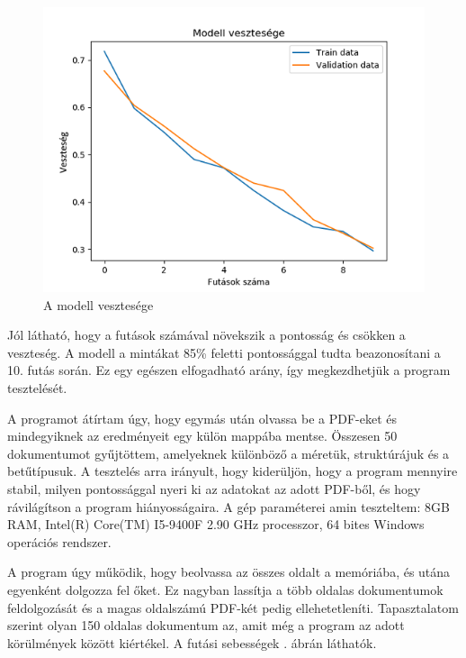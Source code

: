 \begin{figure}[h!]
\centering
\includegraphics[scale=1]{images/loss.png}
\caption{A modell vesztesége}
\label{fig:loss}
\end{figure}

Jól látható, hogy a futások számával növekszik a pontosság és csökken a veszteség. A modell a mintákat 85\% feletti pontossággal tudta beazonosítani a 10. futás során. Ez egy egészen elfogadható arány, így megkezdhetjük a program tesztelését.


A programot átírtam úgy, hogy egymás után olvassa be a PDF-eket és mindegyiknek az eredményeit egy külön mappába mentse. Összesen 50 dokumentumot gyűjtöttem, amelyeknek különböző a méretük, struktúrájuk és a betűtípusuk. A tesztelés arra irányult, hogy kiderüljön, hogy a program mennyire stabil, milyen pontossággal nyeri ki az adatokat az adott PDF-ből, és hogy rávilágítson a program hiányosságaira. A gép paraméterei amin teszteltem: 8GB RAM, Intel(R) Core(TM) I5-9400F 2.90 GHz processzor, 64 bites Windows operációs rendszer.


A program úgy működik, hogy beolvassa az összes oldalt a memóriába, és utána egyenként dolgozza fel őket. Ez nagyban lassítja a több oldalas dokumentumok feldolgozását és a magas oldalszámú PDF-két pedig ellehetetleníti. Tapasztalatom szerint olyan 150 oldalas dokumentum az, amit még a program az adott körülmények között kiértékel. A futási sebességek . ábrán láthatók.


